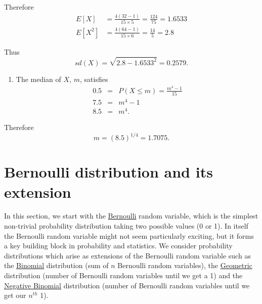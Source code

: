 \documentclass[
]{book}
\providecommand{\tightlist}{%
  \setlength{\itemsep}{0pt}\setlength{\parskip}{0pt}}
\begin{document}
Therefore\\

\begin{align*} 
E [X] &= \frac{4 (32-1)}{15 \times 5} = \frac{124}{75} = 1.6533 \\
E [X^2] &= \frac{4 (64-1)}{15 \times 6} = \frac{14}{5} = 2.8 \end{align*}

Thus\\

\[ sd (X) = \sqrt{2.8 -1.6533^2} = 0.2579. \]

\begin{enumerate}
\def\labelenumi{\arabic{enumi}.}
\setcounter{enumi}{3}
\tightlist
\item
  The median of \(X\), \(m\), satisfies\\

  \begin{eqnarray*}
  0.5 &=& P (X \leq m) = \frac{m^4 -1}{15} \\
  7.5 &=& m^4 -1 \\
  8.5 &=& m^4.
  \end{eqnarray*}
\end{enumerate}

Therefore\\

\[ m = (8.5)^{1/4} =1.7075. \]

\hfill\break

\hypertarget{rv:bernoulli}{%
\section{Bernoulli distribution and its extension}\label{rv:bernoulli}}

In this section, we start with the \protect\hyperlink{rv:Bernoulli:bern}{Bernoulli} random variable, which is the simplest non-trivial probability distribution taking two possible values (0 or 1). In itself the Bernoulli random variable might not seem particularly exciting, but it forms a key building block in probability and statistics. We consider probability distributions which arise as extensions of the Bernoulli random variable such as the \protect\hyperlink{rv:Bernoulli:bin}{Binomial} distribution (sum of \(n\) Bernoulli random variables), the \protect\hyperlink{rv:Bernoulli:geom}{Geometric} distribution (number of Bernoulli random variables until we get a 1) and the \protect\hyperlink{rv:Bernoulli:negbin}{Negative Binomial} distribution (number of Bernoulli random variables until we get our \(n^{th}\) 1).
\end{document}
